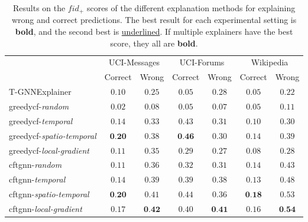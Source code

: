 \begin{table}
    \centering
    \small
    \begin{tabular}{lcccccc}
    \hline
         &  \multicolumn{2}{c}{UCI-Messages}&  \multicolumn{2}{c}{UCI-Forums}&  \multicolumn{2}{c}{Wikipedia}\\
         &  Correct&  Wrong&  Correct&  Wrong&  Correct& Wrong\\
         \hline
         T-GNNExplainer&  $0.10$&  $0.25$&  $0.05$&  $0.28$&  $0.05$& $0.22$\\
         \gls{greedycf}-\textit{random}&  $0.02$&  $0.08$&  $0.05$&  $0.07$&  $0.05$& $0.11$\\
         \gls{greedycf}-\textit{temporal}&  $0.14$&  $0.33$&  $0.43$&  $0.31$&  $0.10$& $0.30$\\
         \gls{greedycf}-\textit{spatio-temporal}&  $\textbf{0.20}$&  $0.38$&  $\textbf{0.46}$&  $0.30$&  $0.14$& $0.39$\\
         \gls{greedycf}-\textit{local-gradient}&  $0.11$&  $0.35$&  $0.29$&  $0.27$&  $0.08$& $0.28$\\
         \gls{cftgnn}-\textit{random}&  $0.11$&  $0.36$&  $0.32$&  $0.31$&  $0.14$& $0.43$\\
         \gls{cftgnn}-\textit{temporal}&  $0.14$&  $0.39$&  $0.39$&  \underline{$0.38$}&  $0.13$& $0.48$\\
         \gls{cftgnn}-\textit{spatio-temporal}&  $\textbf{0.20}$&  \underline{$0.41$}&  \underline{$0.44$}&  $0.36$&  $\textbf{0.18}$& \underline{$0.53$}\\
 \gls{cftgnn}-\textit{local-gradient}& $0.17$& $\textbf{0.42}$& $0.40$& $\textbf{0.41}$& \underline{$0.16$}&$\textbf{0.54}$\\
 \hline
    \end{tabular}
    \caption{Results on the $fid_+$ scores of the different explanation methods for explaining wrong and correct predictions. The best result for each experimental setting is \textbf{bold}, and the second best is \underline{underlined}. If multiple explainers have the best score, they all are \textbf{bold}.}
    \label{t_fid_plus}
\end{table}


